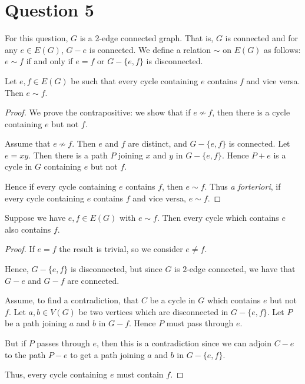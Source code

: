 \documentclass{unswmaths}
\begin{document}
\section*{Question 5}
For this question, $G$ is a 2-edge connected graph. That is, $G$
is connected and for any $e \in E(G)$, $G-e$ is connected. 
We define a relation $\sim$ on $E(G)$ as follows: $e \sim f$ if and only
if $e = f$ or $G - \{e,f\}$ is disconnected.
\begin{proposition}[Part (a)]
\label{5a}
    Let $e,f \in E(G)$ be such that every cycle containing $e$ contains $f$
    and vice versa.
    Then $e \sim f$.
\end{proposition}
\begin{proof}    
    We prove the contrapositive: we show that if $e \nsim f$, then there
    is a cycle containing $e$ but not $f$.
    
    Assume that $e \nsim f$. Then $e$ and $f$ are distinct, and $G - \{e,f\}$
    is connected. Let $e = xy$. Then there is a path $P$ joining $x$ and $y$
    in $G - \{e,f\}$. Hence $P+e$ is a cycle in $G$ containing $e$ but not $f$. 
    
    Hence if every cycle containing $e$ contains $f$, then $e \sim f$.
    Thus \emph{a forteriori}, if every cycle containing $e$ contains $f$
    and vice versa, $e \sim f$.
\end{proof}

\begin{proposition}[Part (b)]
\label{5b}
Suppose we have $e,f \in E(G)$ with $e \sim f$. Then every cycle which contains $e$
also contains $f$.
\end{proposition}
\begin{proof}
    If $e = f$ the result is trivial, so we consider $e \neq f$. 
    
    Hence, $G - \{e,f\}$ is disconnected, but since $G$ is $2$-edge connected,
    we have that $G - e$ and $G-f$ are connected. 
    
    Assume, to find a contradiction, that $C$ be a cycle in $G$ which contains $e$ but not $f$. Let $a,b \in V(G)$
    be two vertices which are disconnected in $G-\{e,f\}$. Let $P$ be a path joining
    $a$ and $b$ in $G-f$. Hence $P$ must pass through $e$.
    
    But if $P$ passes through $e$, then this is a contradiction since we can adjoin $C-e$
    to the path $P-e$ to get a path joining $a$ and $b$ in $G-\{e,f\}$. 
    
    Thus, every cycle containing $e$ must contain $f$.
\end{proof}
\end{document}

